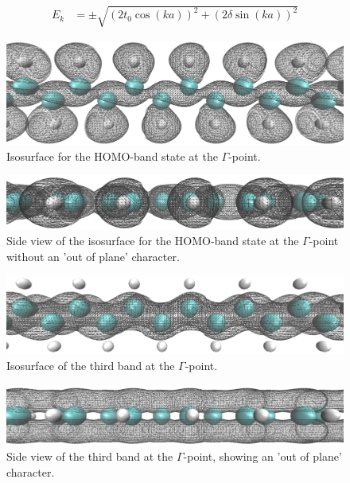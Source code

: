 \begin{align}
E_k &= \pm \sqrt{\left(2t_0\cos(ka)\right)^2+\left(2\delta\sin(ka)\right)^2}
\label{equation_explicit_energy_band}
\end{align} 
\begin{figure}[!p]
	\centering
	\includegraphics[width = 12cm]{Images/polyacetylene/wavefunctions/Homo_mid_k}
	\caption{Isosurface for the HOMO-band state at the $\Gamma$-point.}
	\label{image_homo_mid_k}
\end{figure}
\begin{figure}[!p]
	\centering
	\includegraphics[width = 12cm]{Images/polyacetylene/wavefunctions/Homo_mid_k_Side_View}
	\caption{Side view of the isosurface for the HOMO-band state at the $\Gamma$-point without an 'out of plane' character.}
	\label{image_homo_mid_k_side_view}
\end{figure}
\begin{figure}[!p]
	\centering
	\includegraphics[width = 12cm]{Images/polyacetylene/wavefunctions/Mid_band_2}
	\caption{Isosurface of the third band at the $\Gamma$-point.}
	\label{image_third_band}
\end{figure}
\begin{figure}[!p]
	\centering
	\includegraphics[width = 12cm]{Images/polyacetylene/wavefunctions/Mid_band_2_Side_View}
	\caption{Side view of the third band at the $\Gamma$-point, showing an 'out of plane' character.}
	\label{image_third_band_side_view}
\end{figure}
